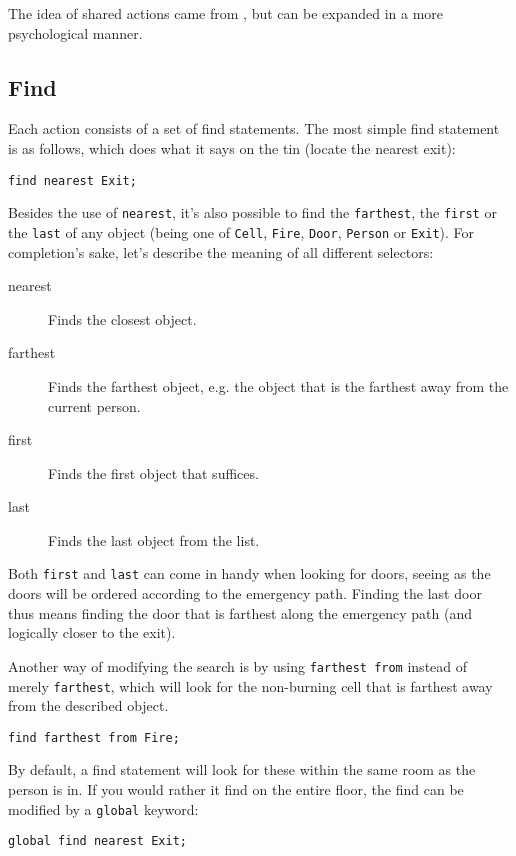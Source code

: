 \documentclass[review]{elsarticle}
\begin{document}
The idea of shared actions came from \cite{Zheng2011}, but can be expanded in a more psychological manner.

\subsection{Find}
Each action consists of a set of find statements. The most simple find statement is as follows, which does what it says on the tin (locate the nearest exit):
\begin{lstlisting}[language=Breact]
	find nearest Exit;
\end{lstlisting}

Besides the use of \texttt{nearest}, it's also possible to find the \texttt{farthest}, the \texttt{first} or the \texttt{last} of any object (being one of \texttt{Cell}, \texttt{Fire}, \texttt{Door}, \texttt{Person} or \texttt{Exit}). For completion's sake, let's describe the meaning of all different selectors:
\begin{description}
	\item[nearest] Finds the closest object.
	\item[farthest] Finds the farthest object, e.g. the object that is the farthest away from the current person.
	\item[first] Finds the first object that suffices.
	\item[last] Finds the last object from the list.
\end{description}
Both \texttt{first} and \texttt{last} can come in handy when looking for doors, seeing as the doors will be ordered according to the emergency path. Finding the last door thus means finding the door that is farthest along the emergency path (and logically closer to the exit).

Another way of modifying the search is by using \texttt{farthest from} instead of merely \texttt{farthest}, which will look for the non-burning cell that is farthest away from the described object.
\begin{lstlisting}[language=Breact]
	find farthest from Fire;
\end{lstlisting}

By default, a find statement will look for these within the same room as the person is in. If you would rather it find on the entire floor, the find can be modified by a \texttt{global} keyword:
\begin{lstlisting}[language=Breact]
	global find nearest Exit;
\end{lstlisting}
\end{document}
